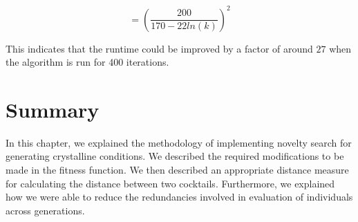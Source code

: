 \begin{equation}
= \left(\frac{200}{170 - 22ln(k)}\right)^2  \label{eq}
\end{equation}

This indicates that the runtime could be improved by a factor of around $27$ when the algorithm is run for 400 iterations.


\section{Summary} \label{rel:summary}

In this chapter, we explained the methodology of implementing novelty search for generating crystalline conditions. We described the required modifications to be made in the fitness function. We then described an appropriate distance measure for calculating the distance between two cocktails. Furthermore, we explained how we were able to reduce the redundancies involved in evaluation of individuals across generations.
